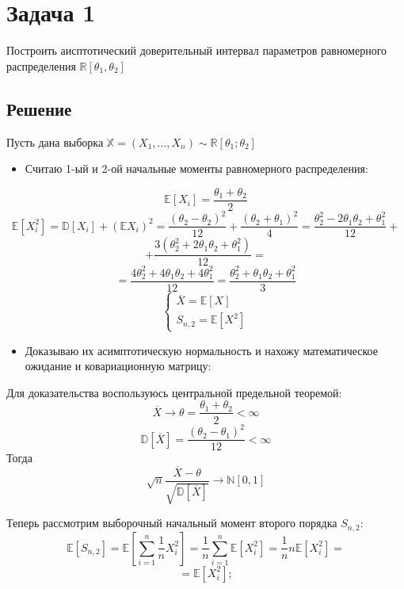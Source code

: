\documentclass{article}
\begin{document}
	
\section{Задача 1}
Построить аисптотический доверительный интервал параметров равномерного распределения $\mathbb{R}[\theta_1, \theta_2]$
\subsection{Решение}

Пусть дана выборка $\mathbb{X} = \left(X_1, ..., X_n\right) \sim \mathbb{R}[\theta_1; \theta_2]$
\begin{itemize}
	\item Считаю 1-ый и 2-ой начальные моменты равномерного распределения:
\end{itemize}

\[\mathbb{E}[X_i] = \frac{\theta_1 + \theta_2}{2}\]
\[\mathbb{E}[X_i^2] = \mathbb{D}[X_i]+\left(\mathbb{E}X_i\right)^2=\frac{(\theta_2-\theta_2)^2}{12}+
\frac{(\theta_2+\theta_1)^2}{4}=\frac{\theta_2^2-2\theta_1\theta_2+\theta_1^2}{12}+\]
\[+\frac{3(\theta_2^2+2\theta_1\theta_2+\theta_1^2)}{12}=\]
\[=\frac{4\theta_2^2+4\theta_1\theta_2+4\theta_1^2}{12}=\frac{\theta_2^2+\theta_1\theta_2+\theta_1^2}{3}\]
\begin{equation*}
	\begin{cases}
		\overline{X} = \mathbb{E}[X]\\
		S_{n,2} = \mathbb{E}[X^2]
	\end{cases}
\end{equation*}

\begin{itemize}
	\item Доказываю их асимптотическую нормальность и нахожу математическое ожидание и ковариационную матрицу:
\end{itemize}

Для доказательства воспользуюсь центральной предельной теоремой:
\[\overline{X}\to \theta = \frac{\theta_1+\theta_2}{2}<\infty\]
\[\mathbb{D}\left[\overline{X}\right] = \frac{\left(\theta_2-\theta_1\right)^2}{12}<\infty\]
Тогда \[\sqrt{n}\frac{\overline{X}-\theta}{\sqrt{\mathbb{D}\left[\overline{X}\right]}}\to\mathbb{N}[0, 1]\]

Теперь рассмотрим выборочный начальный момент второго порядка $S_{n,2}$:
\[\mathbb{E}[S_{n,2}] = \mathbb{E}\left[\sum_{i = 1}^{n}\frac{1}{n}X_i^2\right]=\frac{1}{n}\sum_{i=1}^{n}\mathbb{E}[X_i^2]=\frac{1}{n}n\mathbb{E}[X_i^2]=\]
\[=\mathbb{E}[X_i^2];\]
\end{document}
